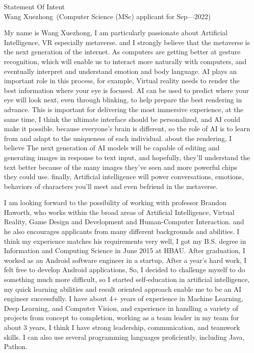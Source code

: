 \documentclass[12pt]{article}
\newcommand{\soptitle}{Statement Of Intent}
\newcommand{\yourname}{Wang Xuezhong}
\begin{document}
\begin{center}\LARGE\soptitle\\
\large \yourname\ (Computer Science (MSc) applicant for Sep---2022)
\end{center}


\sffamily
\mdseries

\bigskip


My name is Wang Xuezhong, I am particularly passionate about Artificial Intelligence, VR especially metaverse. and I strongly believe that the metaverse is the next generation of the internet. As computers are getting better at gesture recognition, which will enable us to interact more naturally with computers, and eventually interpret and understand emotion and body language. AI plays an important role in this process, for example, Virtual reality needs to render the best information where your eye is focused. AI can be used to predict where your eye will look next, even through blinking, to help prepare the best rendering in advance. This is important for delivering the most immersive experience, at the same time, I think the ultimate interface should be personalized, and AI could make it possible. because everyone’s brain is different, so the role of AI is to learn from and adapt to the uniqueness of each individual. about the rendering, I believe The next generation of AI models will be capable of editing and generating images in response to text input, and hopefully, they’ll understand the text better because of the many images they’ve seen and more powerful chips they could use. finally, Artificial intelligence will power conversations, emotions, behaviors of characters you'll meet and even befriend in the metaverse.

\bigskip

I am looking forward to the possibility of working with professor Brandon Haworth, who works within the broad areas of Artificial Intelligence, Virtual Reality, Game Design and Development and Human-Computer Interaction. and he also encourages applicants from many different backgrounds and abilities. I think my experience matches his requirements very well, I got my B.S. degree in Information and Computing Science in June 2015 at HBAU. After graduation, I worked as an Android software engineer in a startup, After a year's hard work, I felt free to develop Android applications, So, I decided to challenge myself to do something much more difficult, so I started self-education in artificial intelligence, my quick learning abilities and result oriented approach enable me to be an AI engineer successfully. I have about  4+ years of experience in Machine Learning, Deep Learning, and Computer Vision, and experience in handling a variety of projects from concept to completion, working as a team leader in my team for about 3 years, I think I have strong leadership, communication, and teamwork skills. I can also use several programming languages ​​proficiently, including Java, Pathon.
\end{document}

